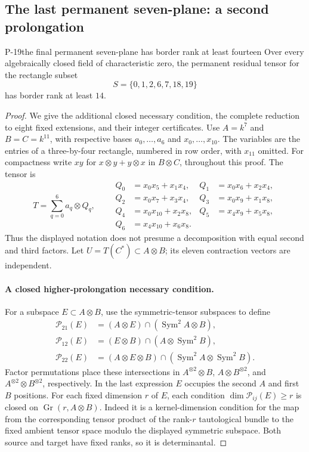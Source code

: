 \subsection{The last permanent seven-plane: a second prolongation}
\begin{finding}{P-19}{the final permanent seven-plane has border rank at least fourteen}
Over every algebraically closed field of characteristic zero, the
permanent residual tensor for the rectangle subset
\[
 S=\{0,1,2,6,7,18,19\}
\]
has border rank at least $14$.
\end{finding}
\begin{proof}
We give the additional closed necessary condition, the complete reduction
to eight fixed extensions, and their integer certificates.
Use $A=k^7$ and $B=C=k^{11}$, with respective bases
$a_0,\ldots,a_6$ and $x_0,\ldots,x_{10}$.  The variables are the entries
of a three-by-four rectangle, numbered in row order, with $x_{11}$
omitted.  For compactness write $xy$ for $x\otimes y+y\otimes x$ in
$B\otimes C$, throughout this proof.  The tensor is
\[
 T=\sum_{q=0}^6a_q\otimes Q_q,
 \qquad
 \begin{aligned}
 Q_0&=x_0x_5+x_1x_4,& Q_1&=x_0x_6+x_2x_4,\\
 Q_2&=x_0x_7+x_3x_4,& Q_3&=x_0x_9+x_1x_8,\\
 Q_4&=x_0x_{10}+x_2x_8,& Q_5&=x_4x_9+x_5x_8,\\
 Q_6&=x_4x_{10}+x_6x_8.
 \end{aligned}
\]
Thus the displayed notation does not presume a decomposition with equal
second and third factors.  Let $U=T(C^*)\subset A\otimes B$;
its eleven contraction vectors are independent.

\paragraph{A closed higher-prolongation necessary condition.}
For a subspace $E\subset A\otimes B$, use the symmetric-tensor
subspaces to define
\begin{align*}
 \mathcal P_{21}(E)&=(A\otimes E)\cap(\operatorname{Sym}^2A\otimes B),\\
 \mathcal P_{12}(E)&=(E\otimes B)\cap(A\otimes\operatorname{Sym}^2B),\\
 \mathcal P_{22}(E)&=(A\otimes E\otimes B)
               \cap(\operatorname{Sym}^2A\otimes\operatorname{Sym}^2B).
\end{align*}
Factor permutations place these intersections in $A^{\otimes2}\otimes B$,
$A\otimes B^{\otimes2}$, and $A^{\otimes2}\otimes B^{\otimes2}$,
respectively.  In the last expression $E$ occupies the second $A$ and
first $B$ positions.
For each fixed dimension $r$ of $E$, each condition
$\dim\mathcal P_{ij}(E)\ge r$ is closed on
$\operatorname{Gr}(r,A\otimes B)$.  Indeed it is a kernel-dimension
condition for the map from the corresponding tensor product of the
rank-$r$ tautological bundle to the fixed ambient tensor space modulo
the displayed symmetric subspace.  Both source and target have fixed
ranks, so it is determinantal.


\end{proof}
